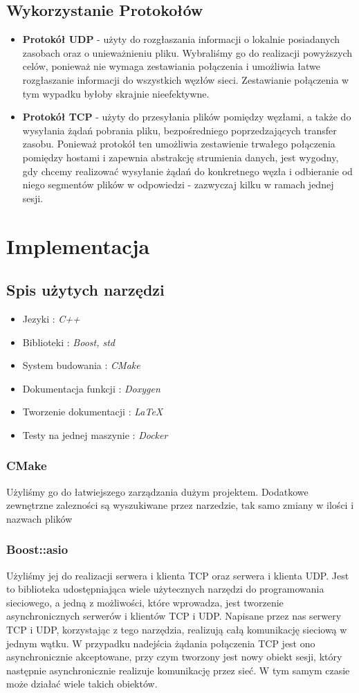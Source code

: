 \documentclass[11pt,oneside]{book}
\newcommand{\+}{\discretionary{\mbox{\scriptsize$\hookleftarrow$}}{}{}}
\begin{document}
\section{Wykorzystanie Protokołów}
\begin{itemize}
\item{\textbf{Protokół UDP}} - użyty do rozgłaszania informacji o lokalnie posiadanych zasobach oraz o unieważnieniu pliku. Wybraliśmy go do realizacji powyższych celów, ponieważ nie wymaga zestawiania połączenia i umożliwia łatwe rozgłaszanie informacji do wszystkich węzłów sieci.  Zestawianie połączenia w tym wypadku byłoby skrajnie nieefektywne. 
\item{\textbf{Protokół TCP}} - użyty do przesyłania plików pomiędzy węzłami, a także do wysyłania żądań pobrania pliku, bezpośredniego poprzedzających transfer zasobu. Ponieważ protokół ten umożliwia zestawienie trwałego połączenia pomiędzy hostami i zapewnia abstrakcję strumienia danych, jest wygodny, gdy chcemy realizować wysyłanie żądań do konkretnego węzła i odbieranie od niego segmentów plików w odpowiedzi - zazwyczaj kilku w ramach jednej sesji.
\end{itemize}
\chapter{Implementacja}
\section{Spis użytych narzędzi}
\begin{itemize}
\item
Jezyki : \textit{C++}
\item
Biblioteki : \textit{Boost, std}
\item 
System budowania : \textit{CMake}
\item
Dokumentacja funkcji : \textit{Doxygen}
\item
Tworzenie dokumentacji : \textit{LaTeX}
\item 
Testy na jednej maszynie : \textit{Docker}
\end{itemize}
\subsection{CMake}
Użyliśmy go do łatwiejszego zarządzania dużym projektem. Dodatkowe zewnętrzne zalezności są wyszukiwane przez narzedzie, tak samo zmiany w ilości i nazwach plików
\subsection{Boost::asio}
Użyliśmy jej do realizacji serwera i klienta TCP oraz serwera i klienta UDP. Jest to biblioteka udostępniająca wiele użytecznych narzędzi do programowania sieciowego, a jedną z możliwości, które wprowadza, jest tworzenie asynchronicznych serwerów i klientów TCP i UDP. Napisane przez nas serwery TCP i UDP, korzystając z tego narzędzia, realizują całą komunikację sieciową w jednym wątku. 
W przypadku nadejścia żądania połączenia TCP jest ono asynchronicznie akceptowane, przy czym tworzony jest nowy obiekt sesji, który następnie asynchronicznie realizuje komunikację przez sieć. W tym samym czasie może działać wiele takich obiektów.
\end{document}
